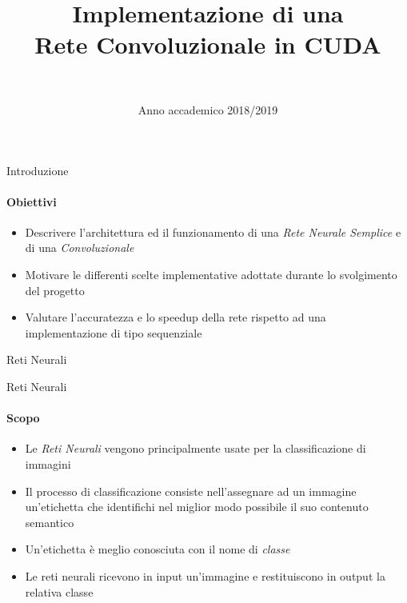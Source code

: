 \documentclass[
 ]{beamer}
\author {
            \texorpdfstring{\hspace*{0.01em}{\Large Michele Valsesia}}{Michele Valsesia} 
            \texorpdfstring{\\ \bigskip}{e}
            \texorpdfstring{\hspace*{0.3em}{\Large Nicholas Aspes }}{Nicholas Aspes}
        }
\begin{document}

\title{Implementazione di una \\ 
       Rete Convoluzionale in CUDA \bigskip}
        
\date{\Large Anno accademico 2018/2019}


     
\begin{frame}
\maketitle
\end{frame}



\begin{frame}{Introduzione}
    \framesubtitle{Obiettivi}  
    
    \begin{itemize} [<+->]
        \setlength\itemsep{3em}
        \item \large Descrivere l'architettura ed il funzionamento di una \emph{Rete Neurale Semplice} e di una \emph{Convoluzionale}
        \item \large Motivare le differenti scelte implementative adottate durante lo svolgimento del progetto
        \item \large Valutare l'accuratezza e lo speedup della rete rispetto ad una implementazione di tipo sequenziale       
    \end{itemize}  
\end{frame}



\begin{frame}[c]
  \centering
  \bigskip \bigskip    
  \Huge Reti Neurali
\end{frame}

\begin{frame}{Reti Neurali}
    \framesubtitle{Scopo}
    \begin{itemize} [<+->]
        \setlength\itemsep{2em}
        \item \large Le \emph{Reti Neurali} vengono principalmente usate per la classificazione di immagini
       \item \large Il processo di classificazione consiste nell'assegnare ad un immagine un'etichetta che identifichi nel miglior modo possibile il suo contenuto semantico
       \item \large Un'etichetta è meglio conosciuta con il nome di \emph{classe}
       \item \large Le reti neurali ricevono in input un'immagine e restituiscono in output la relativa classe 
    \end{itemize}
\end{frame} 
\end{document}
